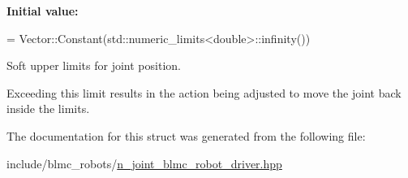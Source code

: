 {\bfseries Initial value\+:}
\begin{DoxyCode}
=
        Vector::Constant(std::numeric\_limits<double>::infinity())
\end{DoxyCode}


Soft upper limits for joint position. 

Exceeding this limit results in the action being adjusted to move the joint back inside the limits. 

The documentation for this struct was generated from the following file\+:\begin{DoxyCompactItemize}
\item 
include/blmc\+\_\+robots/\hyperlink{n__joint__blmc__robot__driver_8hpp}{n\+\_\+joint\+\_\+blmc\+\_\+robot\+\_\+driver.\+hpp}\end{DoxyCompactItemize}
